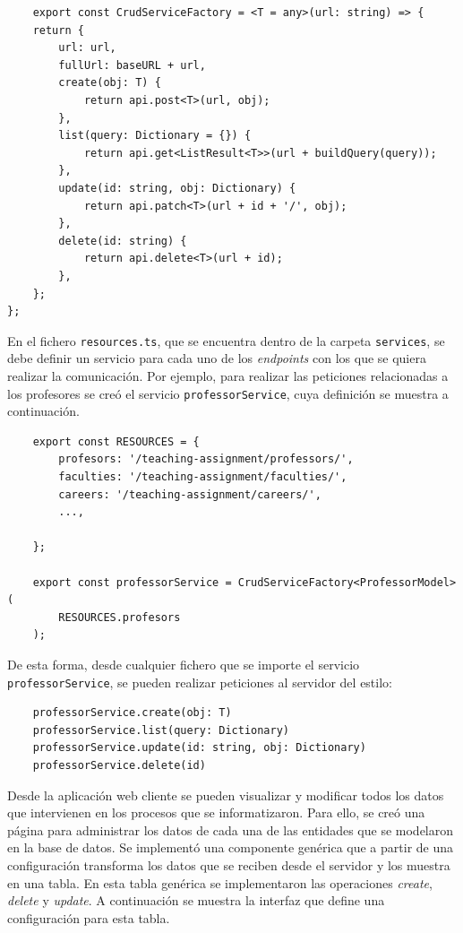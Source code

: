 \begin{verbatim}
    export const CrudServiceFactory = <T = any>(url: string) => {
    return {
        url: url,
        fullUrl: baseURL + url,
        create(obj: T) {
            return api.post<T>(url, obj);
        },
        list(query: Dictionary = {}) {
            return api.get<ListResult<T>>(url + buildQuery(query));
        },
        update(id: string, obj: Dictionary) {
            return api.patch<T>(url + id + '/', obj);
        },
        delete(id: string) {
            return api.delete<T>(url + id);
        },
    };
};
\end{verbatim}


En el fichero \texttt{resources.ts}, que se encuentra dentro de la carpeta \texttt{services},
se debe definir un servicio para cada uno de los \textit{endpoints}  
con los que se quiera realizar la comunicación. Por ejemplo,
para realizar las peticiones relacionadas a los profesores se 
creó el servicio \texttt{professorService}, cuya definición se muestra a continuación.

\begin{verbatim}
    export const RESOURCES = {
        profesors: '/teaching-assignment/professors/',
        faculties: '/teaching-assignment/faculties/',
        careers: '/teaching-assignment/careers/',
        ...,

    };

    export const professorService = CrudServiceFactory<ProfessorModel>(
        RESOURCES.profesors
    );
\end{verbatim}


De esta forma, desde cualquier fichero que se importe el servicio \texttt{professorService},
se pueden realizar peticiones al servidor del estilo:

\begin{verbatim}
    professorService.create(obj: T)
    professorService.list(query: Dictionary)
    professorService.update(id: string, obj: Dictionary)
    professorService.delete(id)
\end{verbatim}


Desde la aplicación web cliente se pueden visualizar y modificar todos los 
datos que intervienen en los procesos que se informatizaron.
Para ello, se creó una página para administrar los 
datos de cada una de las entidades que se modelaron en la base de datos.
Se implementó una componente genérica que a partir de una configuración
transforma los datos que se reciben desde el servidor y los muestra en una tabla.
En esta tabla genérica se implementaron las operaciones \textit{create}, \textit{delete} y \textit{update}. 
A continuación se muestra la interfaz que define una configuración para esta  
tabla.

